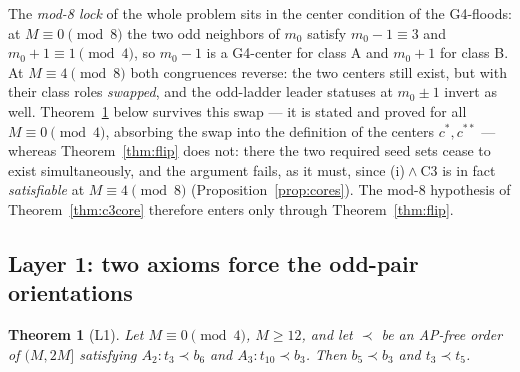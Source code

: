 \documentclass[11pt]{article}
\newtheorem{theorem}{Theorem}
\theoremstyle{definition}
\begin{document}
The \emph{mod-8 lock} of the whole problem sits in the center condition
of the G4-floods: at $M \equiv 0 \pmod 8$ the two odd neighbors of
$m_0$ satisfy $m_0 - 1 \equiv 3$ and $m_0 + 1 \equiv 1 \pmod 4$, so
$m_0 - 1$ is a G4-center for class A and $m_0 + 1$ for class B. At
$M \equiv 4 \pmod 8$ both congruences reverse: the two centers still
exist, but with their class roles \emph{swapped}, and the odd-ladder
leader statuses at $m_0 \pm 1$ invert as well. Theorem~\ref{thm:l1}
below survives this swap --- it is stated and proved for all
$M \equiv 0 \pmod 4$, absorbing the swap into the definition of the
centers $c^{*}, c^{**}$ --- whereas Theorem~\ref{thm:flip} does not: there
the two required seed sets cease to exist simultaneously, and the argument
fails, as it must, since (i)${}\wedge{}\mathrm{C3}$ is in fact
\emph{satisfiable} at $M \equiv 4 \pmod 8$
(Proposition~\ref{prop:cores}). The mod-$8$ hypothesis of
Theorem~\ref{thm:c3core} therefore enters only through
Theorem~\ref{thm:flip}.

\subsection{Layer 1: two axioms force the odd-pair orientations}
\label{sec:l1}

\begin{theorem}[L1]\label{thm:l1}
Let $M \equiv 0 \pmod 4$, $M \ge 12$, and let $\prec$ be an AP-free
order of $(M, 2M]$ satisfying $A_2\colon t_3 \prec b_6$ and
$A_3\colon t_{10} \prec b_3$. Then $b_5 \prec b_3$ and $t_3 \prec t_5$.
\end{theorem}
\end{document}
